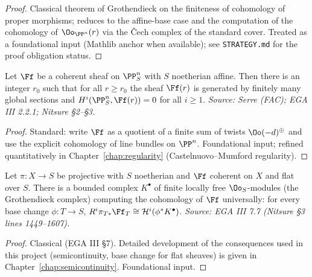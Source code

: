 \begin{proof}
  Classical theorem of Grothendieck on the finiteness of cohomology of proper
  morphisms; reduces to the affine-base case and the computation of the
  cohomology of $\Oo_{\PP^n}(r)$ via the Čech complex of the standard cover.
  Treated as a foundational input (Mathlib anchor when available); see
  \texttt{STRATEGY.md} for the proof obligation status.
\end{proof}

\begin{theorem}
  \label{thm:serre-vanishing}
  Let $\Ff$ be a coherent sheaf on $\PP^n_S$ with $S$ noetherian affine. Then
  there is an integer $r_0$ such that for all $r\ge r_0$ the sheaf $\Ff(r)$ is
  generated by finitely many global sections and $H^i(\PP^n_S,\Ff(r)) = 0$ for
  all $i\ge 1$.
  \textit{Source: Serre (FAC); EGA III 2.2.1; Nitsure §2--§3.}
\end{theorem}

\begin{proof}
  Standard: write $\Ff$ as a quotient of a finite sum of twists
  $\Oo(-d)^{\oplus}$ and use the explicit cohomology of line bundles on
  $\PP^n$. Foundational input; refined quantitatively in
  Chapter~\ref{chap:regularity} (Castelnuovo--Mumford regularity).
\end{proof}

\begin{theorem}
  \label{thm:cohomology-base-change}
  Let $\pi\colon X\to S$ be projective with $S$ noetherian and $\Ff$ coherent on
  $X$ and flat over $S$. There is a bounded complex $K^\bullet$ of finite
  locally free $\Oo_S$-modules (the Grothendieck complex) computing the
  cohomology of $\Ff$ universally: for every base change $\phi\colon T\to S$,
  $R^i\pi_{T*}\Ff_T \cong \mathcal{H}^i(\phi^* K^\bullet)$.
  \textit{Source: EGA III 7.7 (Nitsure §3 lines 1449--1607).}
\end{theorem}

\begin{proof}
  Classical (EGA III §7). Detailed development of the consequences used in this
  project (semicontinuity, base change for flat sheaves) is given in
  Chapter~\ref{chap:semicontinuity}. Foundational input.
\end{proof}

